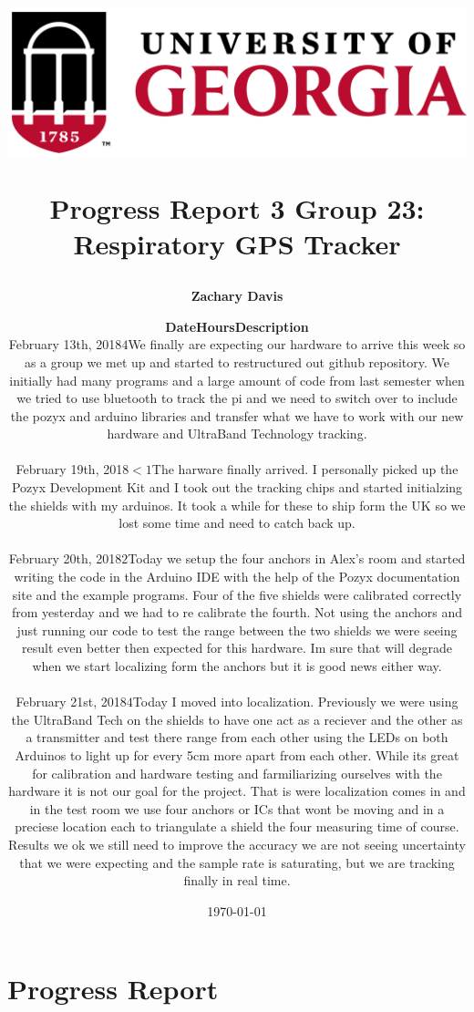 \documentclass[11pt]{report}
\title{
	\begin{center}
		\includegraphics[scale=0.5]{uga.PNG}\\
 	\end{center}
 	Progress Report 3
\bigbreak Group 23: Respiratory GPS Tracker
}
\author{\textbf{Zachary Davis}}
\date{\today}
\begin{document}
\maketitle

\section*{Progress Report}
	\begin{center}
		\author{
		{\normalsize
		\begin{tabular}{m{4cm} m{2cm} m{10cm}}
		\textbf{Date} & \textbf{Hours} & \textbf{Description}\\
		\hline
		February 13th, 2018 & $4$ & We finally are expecting our hardware to arrive this week so as a group we met up and started to restructured out github repository. We initially had many programs and a large amount of code from last semester when we tried to use bluetooth to track the pi and we need to switch over to include the pozyx and arduino libraries and transfer what we have to work with our new hardware and UltraBand Technology tracking.\\
		&&\\
		February 19th, 2018 & $<1$ & The harware finally arrived. I personally picked up the Pozyx Development Kit and I took out the tracking chips and started initialzing the shields with my arduinos. It took a while for these to ship form the UK so we lost some time and need to catch back up.\\
		&&\\
		February 20th, 2018 & $2$ & Today we setup the four anchors in Alex's room and started writing the code in the Arduino IDE with the help of the Pozyx documentation site and the example programs. Four of the five shields were calibrated correctly from yesterday and we had to re calibrate the fourth.  Not using the anchors and just running our code to test the range between the two shields we were seeing result even better then expected for this hardware. Im sure that will degrade when we start localizing form the anchors but it is good news either way.\\
		&&\\
		February 21st, 2018 & $4$ & Today I moved into localization. Previously we were using the UltraBand Tech on the shields to have one act as a reciever and the other as a transmitter and test there range from each other using the LEDs on both Arduinos to light up for every 5cm more apart from each other. While its great for calibration and hardware testing and farmiliarizing ourselves with the hardware it is not our goal for the project. That is were localization comes in and in the test room we use four anchors or ICs that wont be moving and in a preciese location each to triangulate a shield the four measuring time of course. Results we ok we still need to improve the accuracy we are not seeing uncertainty that we were expecting and the sample rate is saturating, but we are tracking finally in real time.\\

\end{tabular}}}
\end{center}
\end{document}
